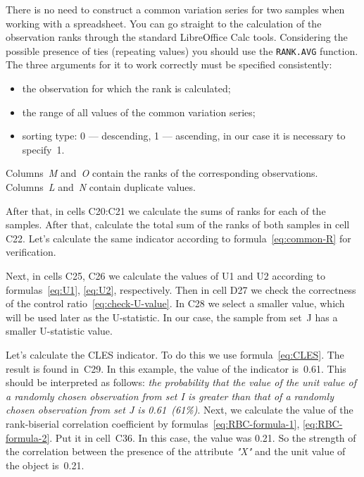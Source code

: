 \documentclass[]{scrreprt}
\begin{document}
There is no need to construct a common variation series for two samples when working with a spreadsheet. You can go straight to the calculation of the observation ranks through the standard LibreOffice Calc tools. Considering the possible presence of ties (repeating values) you should use the \texttt{RANK.AVG} function. The three arguments for it to work correctly must be specified consistently:
\begin{itemize}
	\item the observation for which the rank is calculated;
	\item the range of all values of the common variation series;
	\item sorting type: 0 --- descending, 1 --- ascending, in our case it is necessary to specify~1.
\end{itemize}
Columns~\textit{M} and~\textit{O} contain the ranks of the corresponding observations. Columns~\textit{L} and~\textit{N} contain duplicate values.

After that, in cells C20:C21 we calculate the sums of ranks for each of the samples. After that, calculate the total sum of the ranks of both samples in cell C22. Let's calculate the same indicator according to formula~\ref{eq:common-R} for verification.

Next, in cells C25, C26 we calculate the values of U1 and U2 according to formulas~\ref{eq:U1}, \ref{eq:U2}, respectively. Then in cell D27 we check the correctness of the control ratio~\ref{eq:check-U-value}. In C28 we select a smaller value, which will be used later as the U-statistic. In our case, the sample from set~J has a smaller U-statistic value.

Let's calculate the CLES indicator. To do this we use formula~\ref{eq:CLES}. The result is found in~C29. In this example, the value of the indicator is~0.61. This should be interpreted as follows: \emph{the probability that the value of the unit value of a randomly chosen observation from set I is greater than that of a randomly chosen observation from set J is 0.61~(61\%)}. Next, we calculate the value of the rank-biserial correlation coefficient by formulas~\ref{eq:RBC-formula-1}, \ref{eq:RBC-formula-2}. Put it in cell~C36. In this case, the value was 0.21. So the strength of the correlation between the presence of the attribute \textit{"X"} and the unit value of the object is~0.21.
\end{document}
